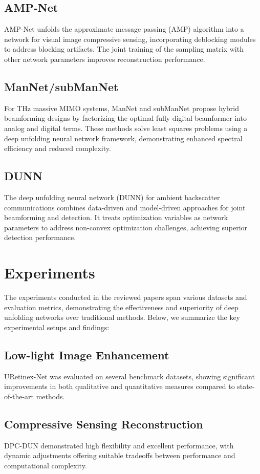 \documentclass[11pt]{article}
\begin{document}
\subsection{AMP-Net}
AMP-Net unfolds the approximate message passing (AMP) algorithm into a network for visual image compressive sensing, incorporating deblocking modules to address blocking artifacts. The joint training of the sampling matrix with other network parameters improves reconstruction performance.

\subsection{ManNet/subManNet}
For THz massive MIMO systems, ManNet and subManNet propose hybrid beamforming designs by factorizing the optimal fully digital beamformer into analog and digital terms. These methods solve least squares problems using a deep unfolding neural network framework, demonstrating enhanced spectral efficiency and reduced complexity.

\subsection{DUNN}
The deep unfolding neural network (DUNN) for ambient backscatter communications combines data-driven and model-driven approaches for joint beamforming and detection. It treats optimization variables as network parameters to address non-convex optimization challenges, achieving superior detection performance.

\section{Experiments}
The experiments conducted in the reviewed papers span various datasets and evaluation metrics, demonstrating the effectiveness and superiority of deep unfolding networks over traditional methods. Below, we summarize the key experimental setups and findings:

\subsection{Low-light Image Enhancement}
URetinex-Net was evaluated on several benchmark datasets, showing significant improvements in both qualitative and quantitative measures compared to state-of-the-art methods.

\subsection{Compressive Sensing Reconstruction}
DPC-DUN demonstrated high flexibility and excellent performance, with dynamic adjustments offering suitable tradeoffs between performance and computational complexity.
\end{document}
